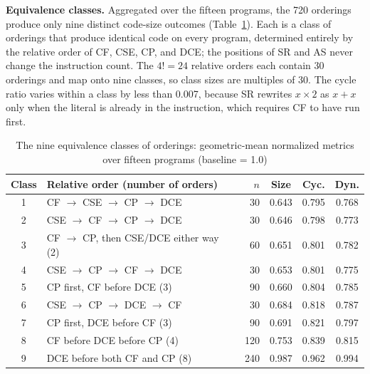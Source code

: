\documentclass[conference,a4paper]{IEEEtran}
\begin{document}
\textbf{Equivalence classes.} Aggregated over the fifteen programs, the 720 orderings produce only nine distinct code-size outcomes (Table~\ref{tab:classes}). Each is a class of orderings that produce identical code on every program, determined entirely by the relative order of CF, CSE, CP, and DCE; the positions of SR and AS never change the instruction count. The $4! = 24$ relative orders each contain 30 orderings and map onto nine classes, so class sizes are multiples of 30. The cycle ratio varies within a class by less than 0.007, because SR rewrites $x \times 2$ as $x + x$ only when the literal is already in the instruction, which requires CF to have run first.

\begin{table}[!htbp]
\centering
\caption{The nine equivalence classes of orderings: geometric-mean normalized metrics over fifteen programs (baseline = 1.0)}
\label{tab:classes}
\renewcommand{\arraystretch}{1.05}
{\footnotesize
\setlength{\tabcolsep}{2.5pt}
\begin{tabular}{@{}clrccc@{}}
\toprule
\textbf{Class} & \textbf{Relative order (number of orders)} & \textbf{$n$} & \textbf{Size} & \textbf{Cyc.} & \textbf{Dyn.} \\
\midrule
1 & CF $\to$ CSE $\to$ CP $\to$ DCE & 30 & 0.643 & 0.795 & 0.768 \\
2 & CSE $\to$ CF $\to$ CP $\to$ DCE & 30 & 0.646 & 0.798 & 0.773 \\
3 & CF $\to$ CP, then CSE/DCE either way (2) & 60 & 0.651 & 0.801 & 0.782 \\
4 & CSE $\to$ CP $\to$ CF $\to$ DCE & 30 & 0.653 & 0.801 & 0.775 \\
5 & CP first, CF before DCE (3) & 90 & 0.660 & 0.804 & 0.785 \\
6 & CSE $\to$ CP $\to$ DCE $\to$ CF & 30 & 0.684 & 0.818 & 0.787 \\
7 & CP first, DCE before CF (3) & 90 & 0.691 & 0.821 & 0.797 \\
8 & CF before DCE before CP (4) & 120 & 0.753 & 0.839 & 0.815 \\
9 & DCE before both CF and CP (8) & 240 & 0.987 & 0.962 & 0.994 \\
\bottomrule
\end{tabular}
}
\end{table}
\end{document}
